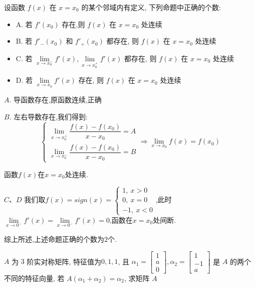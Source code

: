 \begin{example}[][Exam: 34.1.5]
	设函数 $f(x)$ 在 $x=x_{0}$ 的某个邻域内有定义, 下列命题中正确的个数:  
\begin{itemize}
	\item A. 若 $f'(x_{0})$ 存在,则 $f(x)$ 在 $x=x_{0}$ 处连续
	\item B. 若 $f'_{-}(x_{0})$ 和 $f'_{+}(x_{0})$ 都存在, 则 $f(x)$ 在 $x=x_{0}$ 处连续
	\item C. 若 $\lim\limits_{x\to x_{0}^{-}}f'(x), \lim\limits_{x\to x_{0}^{+}}f'(x)$ 都存在, 则 $f(x)$ 在 $x=x_{0}$ 处连续
	\item D. 若 $\lim\limits_{x\to x_{0}}f'(x)$ 存在, 则 $f(x)$ 在 $x=x_{0}$ 处连续
\end{itemize}
\end{example}

\begin{solution}

	$A$. 导函数存在,原函数连续,正确
	
	$B$. 左右导数存在,我们得到:  
	$$\left\lbrace
	\begin{array}{l}
		\lim\limits_{x\to x_{0}^{+}}\dfrac{f(x)-f(x_{0})}{x-x_{0}}=A\\
		\lim\limits_{x\to x_{0}^{-}}\dfrac{f(x)-f(x_{0})}{x-x_{0}}=B
	\end{array}
	\right. \Rightarrow \lim\limits_{x\to x_{0}}f(x)=f(x_{0})$$
	
	函数$f(x)$在$x=x_{0}$处连续.
	
	$C\text{、}D$ 我们取$f(x)=sign(x)=\left\lbrace
	\begin{array}{l}
		1,\ x>0\\
		0,\ x=0\\
		-1,\ x<0
	\end{array}
	\right. $,此时$\lim\limits_{x\to 0^{-}}f'(x)=\lim\limits_{x\to 0^{-}}f'(x)=0$,函数在$x=x_{0}$处间断.
	
	综上所述,上述命题正确的个数为$2$个.
\end{solution}

\begin{example}[][Exam: 34.1.6]
	$A$ 为 $3$ 阶实对称矩阵, 特征值为$0,1,1$, 且 $\alpha_{1}=\begin{bmatrix}
	1\\a\\0
	\end{bmatrix}, \alpha_{2}=\begin{bmatrix}
	1\\-1\\a
	\end{bmatrix}$ 是 $A$ 的两个不同的特征向量, 若 $A(\alpha_{1}+\alpha_{2}) = \alpha_{2}$, 求矩阵 $A$
\end{example}

